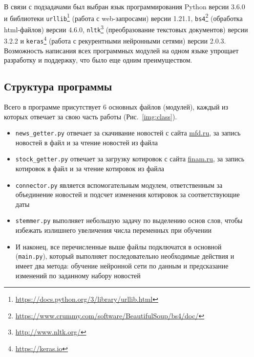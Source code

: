 \documentclass[14pt]{matmex-diploma-custom}
\begin{document}
В связи с подзадачами был выбран язык программирования Python версии 3.6.0 и библиотеки \texttt{urllib}\footnote{\url{https://docs.python.org/3/library/urllib.html}} (работа с web-запросами) версии 1.21.1, \texttt{bs4}\footnote{\url{https://www.crummy.com/software/BeautifulSoup/bs4/doc/}} (обработка html-файлов) версии 4.6.0, \texttt{nltk}\footnote{\url{http://www.nltk.org/}}\cite{tools:nltk} (преобразование текстовых документов) версии 3.2.2 и \texttt{keras}\footnote{\url{https://keras.io}}\cite{tools:keras} (работа с рекурентными нейронными сетями) версии 2.0.3. Возможность написания всех программных модулей на одном языке упрощает разработку и поддержку, что было еще одним преимуществом.

\subsection{Структура программы}


Всего в программе присутствует 6 основных файлов (модулей), каждый из которых отвечает за свою часть работы (Рис.~\ref{img:class}).

\begin{itemize}
\item \texttt{news\_getter.py} отвечает за скачивание новостей с сайта \url{mfd.ru}, за запись новостей в файл и за чтение новостей из файла
\item \texttt{stock\_getter.py} отвечает за загрузку котировок с сайта \url{finam.ru}, за запись котировок в файл и за чтение котировок из файла
\item \texttt{connector.py} является вспомогательным модулем, ответственным за объединение новостей и подсчет изменения котировок за соответствующие даты
\item \texttt{stemmer.py} выполняет небольшую задачу по выделению основ слов, чтобы избежать излишнего увеличения числа переменных при обучении
\item И наконец, все перечисленные выше файлы подключатся в основной (\texttt{main.py}), который выполняет последовательно необходимые действия и имеет два метода: обучение нейронной сети по данным и предсказание изменений по заданному набору новостей
\end{itemize}
\end{document}
